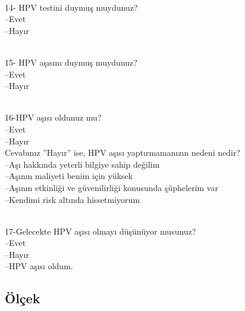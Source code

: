 \documentclass[turkish]{article}
\begin{document}
\\14- HPV testini duymuş muydunuz?
  \\ --Evet
   \\--Hayır

\\15- HPV aşısını duymuş muydunuz?
  \\ --Evet 
   \\--Hayır
  
\\16-HPV aşısı oldunuz mu?
  \\ --Evet
   \\--Hayır
\\Cevabınız ”Hayır” ise, HPV aşısı yaptırmamanızın nedeni nedir?
  \\ --Aşı hakkında yeterli bilgiye sahip değilim
   \\--Aşının maliyeti benim için yüksek
  \\ --Aşının etkinliği ve güvenilirliği konusunda şüphelerim var
   \\--Kendimi risk altında hissetmiyorum

\\17-Gelecekte HPV aşısı olmayı düşünüyor musunuz?
  \\ --Evet
   \\--Hayır
   \\--HPV aşısı oldum.

\newpage
\subsection{Ölçek}
\end{document}
